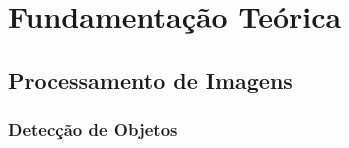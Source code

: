 \graphicspath{{figuras/}}
\chapter{Fundamentação Teórica} \label{Cap:Fundamentacao}


\section{Processamento de Imagens}
\subsection{Detecção de Objetos}
\label{Sec:TiposDeDeteccaoDeObjetos}
	

